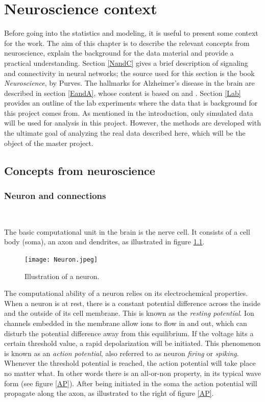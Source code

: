 
\chapter{Neuroscience context}
\label{ch:2}

Before going into the statistics and modeling, it is useful to present some context for the work. The aim of this chapter is to describe the relevant concepts from neuroscience, explain the background for the data material and provide a practical understanding. Section \ref{NandC} gives a brief description of signaling and connectivity in neural networks; the source used for this section is the book \textit{Neuroscience}, by Purves. The hallmarks for Alzheimer's disease in the brain are described in section \ref{EandA}, whose content is based on \cite{Gomez} and \cite{Witter:2011}. Section \ref{Lab} provides an outline of the lab experiments where the data that is background for this project comes from. As mentioned in the introduction, only simulated data will be used for analysis in this project. However, the methods are developed with the ultimate goal of analyzing the real data described here, which will be the object of the master project. 

\section{Concepts from neuroscience}

\subsection{Neuron and connections}\\
\label{NandC}

The basic computational unit in the brain is the nerve cell. It consists of a cell body (soma), an axon and dendrites, as illustrated in figure \ref{neuron}.
\begin{figure}[h]
    \caption{Illustration of a neuron.}
    \label{neuron}
    \centering
    \texttt{[image: Neuron.jpeg]}
\end{figure} 

The computational ability of a neuron relies on its electrochemical properties. When a neuron is at rest, there is a constant potential difference across the inside and the outside of its cell membrane. This is known as the \textit{resting potential}. Ion channels embedded in the membrane allow ions to flow in and out, which can disturb the potential difference away from this equilibrium. If the voltage hits a certain threshold value, a rapid depolarization will be initiated. This phenomenon is known as an \textit{action potential}, also referred to as neuron \textit{firing} or \textit{spiking}. Whenever the threshold potential is reached, the action potential will take place no matter what. In other words there is an all-or-non property, in its typical wave form (see figure \ref{AP}). After being initiated in the soma the action potential will propagate along the axon, as illustrated to the right of figure \ref{AP}.

